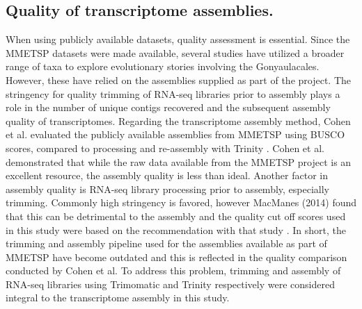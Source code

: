 \documentclass[12pt]{article}
\begin{document}
\subsection*{Quality of transcriptome assemblies.}
When using publicly available datasets, quality assessment is essential. 
Since the MMETSP datasets were made available, several studies have utilized a broader range of taxa to explore evolutionary stories involving the Gonyaulacales. 
However, these have relied on the assemblies supplied as part of the project. 
The stringency for quality trimming of RNA-seq libraries prior to assembly plays a role in the number of unique contigs recovered and the subsequent assembly quality of transcriptomes. 
Regarding the transcriptome assembly method, Cohen et al. evaluated the publicly available assemblies from MMETSP using BUSCO scores, compared to processing and re-assembly with Trinity \cite{cohen-reass}. 
Cohen et al. demonstrated that while the raw data available from the MMETSP project is an excellent resource, the assembly quality is less than ideal. 
Another factor in assembly quality is RNA-seq library processing prior to assembly, especially trimming. 
Commonly high stringency is favored, however MacManes (2014) found that this can be detrimental to the assembly and the quality cut off scores used in this study were based on the recommendation with that study \cite{macmanes2014optimal}.
In short, the trimming and assembly pipeline used for the assemblies available as part of MMETSP have become outdated and this is reflected in the quality comparison conducted by Cohen et al. 
To address this problem, trimming and assembly of RNA-seq libraries using Trimomatic and Trinity respectively were considered integral to the transcriptome assembly in this study.
\end{document}
